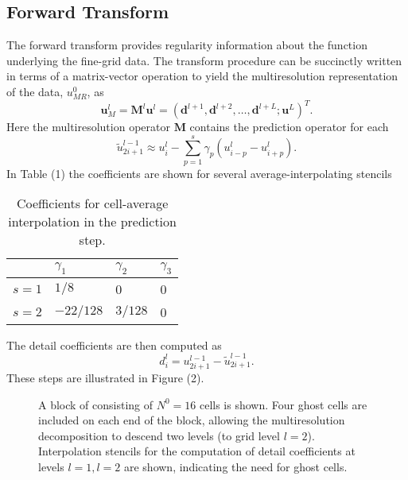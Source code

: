 \documentclass{article}
\begin{document}

    \subsection*{Forward Transform}

        The forward transform provides regularity information about the function
        underlying the fine-grid data. The transform procedure can be succinctly
        written in terms of a matrix-vector operation to yield the
        multiresolution representation of the data, $u_{MR}^{0}$, as
        \begin{equation}
            \bm{u}_{M}^{l} = \bm{M}^{l} \bm{u}^{l} = \left( \bm{d}^{l+1}, \bm{d}^{l+2},
            \dots, \bm{d}^{l+L}; \bm{u}^{L} \right)^{T}.
        \end{equation}
        Here the multiresolution operator $\bm{M}$ contains the prediction
        operator for each
        \begin{equation}
            \tilde{u}_{2i+1}^{l-1} \approx u_{i}^{l} - \sum_{p=1}^{s}
            \gamma_{p} \left( u^{l}_{i-p} - u^{l}_{i+p} \right).
        \end{equation}
        In Table (1) the coefficients are shown for several average-interpolating stencils
        \begin{table}
            \centering
            \begin{tabular}{|l|l|l|l|}
            \hline
                & $\gamma_{1}$ & $\gamma_{2}$ & $\gamma_{3}$ \\ \hline
                $s=1$ & $1/8$ & 0 & 0 \\ \hline
                $s=2$ & $-22/128$ & $3/128$ & 0 \\ \hline
            \end{tabular}
            \caption{Coefficients for cell-average interpolation in the prediction step.}
        \end{table}
        The detail coefficients are then computed as
        \begin{equation}
            d^{l}_{i} = u^{l-1}_{2i+1} - \tilde{u}^{l-1}_{2i+1}.
        \end{equation}
        These steps are illustrated in Figure (2).

        \begin{figure}[H]
            \center
            
            \caption{A block of consisting of $N^{0} = 16$ cells is shown. Four
            ghost cells are included on each end of the block, allowing the
            multiresolution decomposition to descend two levels (to grid level
            $l=2$). Interpolation stencils for the computation of detail
            coefficients at levels $l=1, l=2$ are shown, indicating the need for ghost cells.}
        \end{figure}
\end{document}
